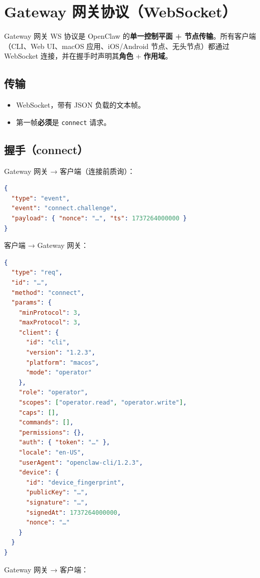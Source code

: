 \clearpage

\section{Gateway 网关协议（WebSocket）}


Gateway 网关 WS 协议是 OpenClaw 的\textbf{单一控制平面 + 节点传输}。所有客户端（CLI、Web UI、macOS 应用、iOS/Android 节点、无头节点）都通过 WebSocket 连接，并在握手时声明其\textbf{角色} + \textbf{作用域}。

\subsection{传输}


\begin{itemize}
  \item WebSocket，带有 JSON 负载的文本帧。
  \item 第一帧\textbf{必须}是 \texttt{connect} 请求。
\end{itemize}


\subsection{握手（connect）}


Gateway 网关 → 客户端（连接前质询）：

\begin{lstlisting}[language=json]
{
  "type": "event",
  "event": "connect.challenge",
  "payload": { "nonce": "…", "ts": 1737264000000 }
}
\end{lstlisting}


客户端 → Gateway 网关：

\begin{lstlisting}[language=json]
{
  "type": "req",
  "id": "…",
  "method": "connect",
  "params": {
    "minProtocol": 3,
    "maxProtocol": 3,
    "client": {
      "id": "cli",
      "version": "1.2.3",
      "platform": "macos",
      "mode": "operator"
    },
    "role": "operator",
    "scopes": ["operator.read", "operator.write"],
    "caps": [],
    "commands": [],
    "permissions": {},
    "auth": { "token": "…" },
    "locale": "en-US",
    "userAgent": "openclaw-cli/1.2.3",
    "device": {
      "id": "device_fingerprint",
      "publicKey": "…",
      "signature": "…",
      "signedAt": 1737264000000,
      "nonce": "…"
    }
  }
}
\end{lstlisting}


Gateway 网关 → 客户端：

